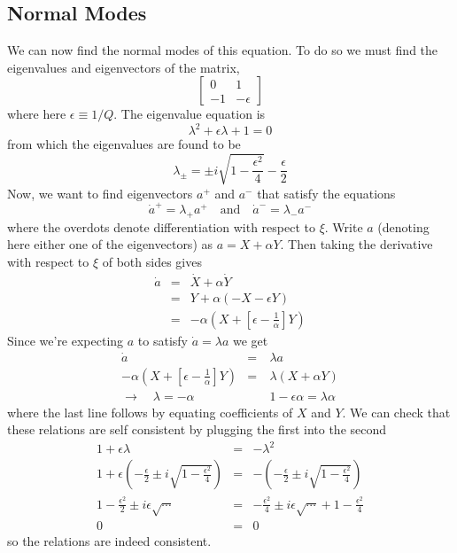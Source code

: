 \subsection{Normal Modes}
We can now find the normal modes of this equation.
To do so we must find the eigenvalues and eigenvectors of the matrix, \begin{equation}
\left[ \begin{array}{cc} 0 & 1 \\ -1 & -\epsilon \end{array} \right] \end{equation}
where here $\epsilon \equiv 1/Q$.
The eigenvalue equation is \begin{equation}
\lambda^2 + \epsilon \lambda + 1 = 0 \end{equation}
from which the eigenvalues are found to be \begin{equation}
\lambda_{\pm} = \pm i \sqrt{1 - \frac{\epsilon^2}{4}} - \frac{\epsilon}{2} \end{equation}
Now, we want to find eigenvectors $a^+$ and $a^-$ that satisfy the equations \begin{equation}
\dot{a}^+=\lambda_+ a^+ \quad \textrm{and} \quad \dot{a}^-=\lambda_- a^- \end{equation}
where the overdots denote differentiation with respect to $\xi$.
Write $a$ (denoting here either one of the eigenvectors) as $a = X+\alpha Y$.
Then taking the derivative with respect to $\xi$ of both sides gives \begin{eqnarray}
\dot{a} &=& \dot{X}+\alpha \dot{Y}\\
&=& Y+\alpha(-X-\epsilon Y)\\
&=& -\alpha \left( X+\left[ \epsilon - \frac{1}{\alpha} \right] Y \right) \end{eqnarray}
Since we're expecting $a$ to satisfy $\dot{a} = \lambda a$ we get \begin{eqnarray}
\dot{a} &=& \lambda a \\
-\alpha \left( X+\left[ \epsilon - \frac{1}{\alpha} \right] Y \right) &=& \lambda \left( X + \alpha Y \right) \\
\rightarrow \quad \lambda=-\alpha &\quad& 1-\epsilon \alpha = \lambda \alpha \end{eqnarray}
where the last line follows by equating coefficients of $X$ and $Y$.
We can check that these relations are self consistent by plugging the first into the second \begin{eqnarray}
1+\epsilon \lambda &=& -\lambda^2 \\
1+\epsilon \left( -\frac{\epsilon}{2} \pm i \sqrt{1-\frac{\epsilon^2}{4}} \right) &=&
-\left(-\frac{\epsilon}{2}\pm i \sqrt{1-\frac{\epsilon^2}{4}} \right) \\
1-\frac{\epsilon^2}{2}\pm i \epsilon \sqrt{\cdots} &=&
-\frac{\epsilon^2}{4}\pm i \epsilon\sqrt{\cdots} + 1 -\frac{\epsilon^2}{4}\\
0 &=& 0 \end{eqnarray}
so the relations are indeed consistent.

